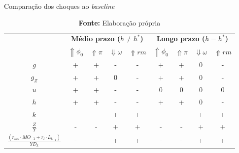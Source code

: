 \begin{table}[H]
	\centering
	\caption{Comparação dos choques ao \textit{baseline}}
	\label{ResumoChoques}
		\begin{tabular}{c|c|c|c|c||c|c|c|c}
			\hline\hline
			\multirow{2}{*}{} & \multicolumn{4}{c||}{\textbf{Médio prazo ($h \neq h^*$)}} & \multicolumn{4}{c}{\textbf{Longo prazo ($h = h^*$)}} \\ \cline{2-9} 
			& \textbf{$\Uparrow \phi_0$} & \textbf{$\Uparrow \pi$} & \textbf{$\Downarrow \omega$} & \textbf{$\Uparrow rm$} & \textbf{$\Uparrow \phi_0$} & \textbf{$\Uparrow \pi$} & \textbf{$\Downarrow \omega$} & \textbf{$\Uparrow rm$} \\ \hline
			\textbf{$g$} & + & + & - & - & + & + & 0 & - \\ \hline
			\textbf{$g_Z$} & + & + & 0 & - & + & + & 0 & - \\ \hline
			\textbf{$u$} & + & + & - & - & 0 & 0 & 0 & 0 \\ \hline
			\textbf{$h$} & + & + & - & - & + & + & 0 & - \\ \hline
			\textbf{$k$} & - & - & + & + & - & - & + & + \\ \hline
			\textbf{$\frac{Z}{Y}$} & - & - & + & + & - & - & + & + \\ \hline
			\textit{$\frac{(r_{mo}\cdot MO_{-1} + r_l\cdot L_{k_{-1}})}{YD_k}$} & - & - & + & + & - & - & + & + \\ \hline\hline
		\end{tabular}%
	\caption*{\textbf{Fonte:} Elaboração própria}
\end{table}


